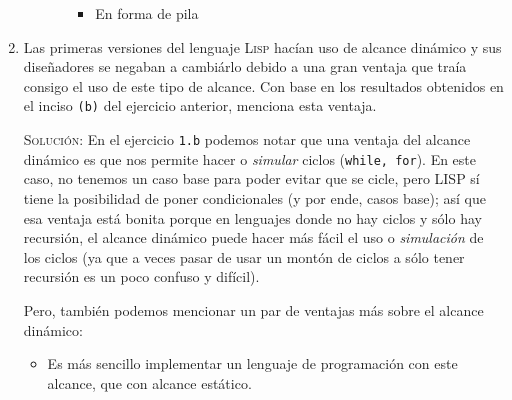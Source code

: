 \documentclass[letterpaper,11pt]{article}
\begin{document}
\begin{enumerate}
\begin{enumerate}
\begin{itemize}
\begin{itemize}
                \item En forma de pila
                \begin{center}
                \begin{drawstack}[scale=1.78]
                \end{drawstack}
                \end{center}
            \end{itemize}
        \end{itemize}
    \end{enumerate}
    
    \newpage
    \item Las primeras versiones del lenguaje \textsc{Lisp} hacían uso de 
    alcance dinámico y sus diseñadores se negaban a cambiárlo debido a una 
    gran ventaja que traía consigo el uso de este tipo de alcance. Con base 
    en los resultados obtenidos en el inciso \texttt{(b)} del ejercicio 
    anterior, menciona esta ventaja.

    \textsc{Solución:} En el ejercicio \texttt{1.b} podemos notar que una 
    ventaja del alcance dinámico es que nos permite hacer o \textit{simular}
    ciclos (\texttt{while, for}). En este caso, no tenemos un caso base para 
    poder evitar que se cicle, pero LISP sí tiene la posibilidad de poner 
    condicionales (y por ende, casos base); así que esa ventaja está bonita 
    porque en lenguajes donde no hay ciclos y sólo hay recursión, el alcance 
    dinámico puede hacer más fácil el uso o \textit{simulación} de los
    ciclos (ya que a veces pasar de usar un montón de ciclos a sólo tener 
    recursión es un poco confuso y difícil).

    Pero, también podemos mencionar un par de ventajas más sobre el alcance 
    dinámico:
    \begin{itemize}
        \item Es más sencillo implementar un lenguaje de programación con este 
        alcance, que con alcance estático.


\end{itemize}
\end{enumerate}
\end{document}
